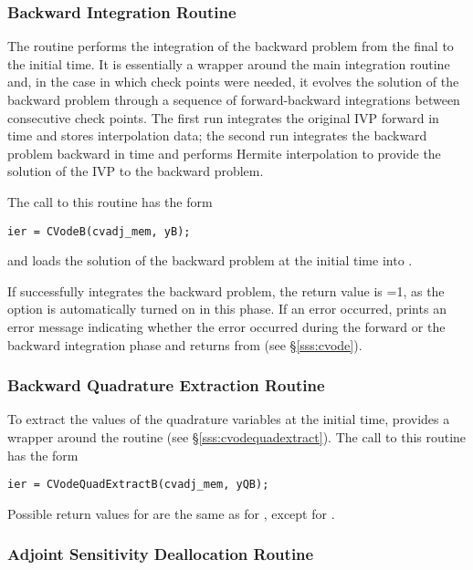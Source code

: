\subsubsection{Backward Integration Routine}\label{sss:cvodeb}

The routine  performs the integration of the backward problem
from the final to the initial time. It is essentially a wrapper
around the {\cvodes} main integration routine  and, in the case
in which check points were needed, it evolves the solution of the backward 
problem through a sequence of forward-backward integrations between consecutive
check points. The first run integrates the original IVP forward in time and
stores interpolation data; the second run integrates the backward problem 
backward in time and performs Hermite interpolation to provide
the solution of the IVP to the backward problem.

The call to this routine has the form
\begin{verbatim}
ier = CVodeB(cvadj_mem, yB);
\end{verbatim}
and loads the solution of the backward problem at the initial time into
. 

If  successfully integrates the backward problem, the return value
is =1, as the  option is automatically turned on in this
phase. If an error occurred,  prints an error message indicating whether 
the error occurred during the forward or the backward integration phase and returns 
 from  (see \S\ref{sss:cvode}).


\subsubsection{Backward Quadrature Extraction Routine}

To extract the values of the quadrature variables at the initial time,
{\cvodes} provides a wrapper around the routine 
(see \S\ref{sss:cvodequadextract}). The call to this routine has the form
\begin{verbatim}
ier = CVodeQuadExtractB(cvadj_mem, yQB);
\end{verbatim}
Possible return values for  are the same as for
, except for .

\subsubsection{Adjoint Sensitivity Deallocation Routine}\label{sss:cvadjfree}

